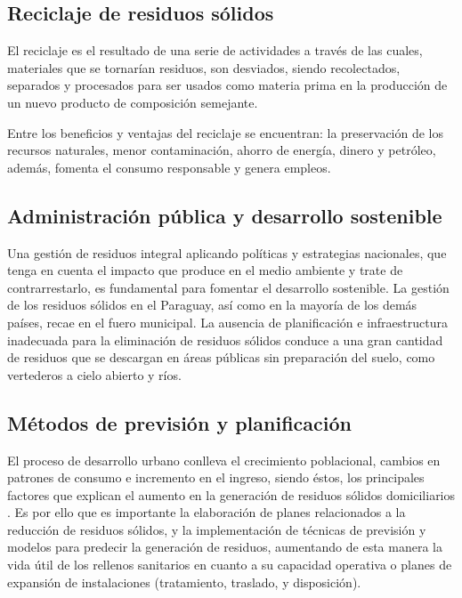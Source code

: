 \subsection{Reciclaje de residuos sólidos}

El reciclaje es el resultado de una serie de actividades a través de las cuales, materiales que se tornarían residuos, son desviados, siendo recolectados, separados y procesados para ser usados como materia prima en la producción de un nuevo producto de composición semejante.

Entre los beneficios y ventajas del reciclaje se encuentran: la preservación de los recursos naturales, menor contaminación, ahorro de energía, dinero y petróleo, además, fomenta el consumo responsable y genera empleos.

\subsection{Administración pública y desarrollo sostenible}

Una gestión de residuos integral aplicando políticas y estrategias nacionales, que tenga en cuenta el impacto que produce en el medio ambiente y trate de contrarrestarlo, es fundamental para fomentar el desarrollo sostenible. La gestión de los residuos sólidos en el Paraguay, así como en la mayoría de los demás países, recae en el fuero municipal. La ausencia de planificación e infraestructura inadecuada para la eliminación de residuos sólidos conduce a una gran cantidad de residuos que se descargan en áreas públicas sin preparación del suelo, como vertederos a cielo abierto y ríos.


\subsection{Métodos de previsión y planificación}

El proceso de desarrollo urbano conlleva el crecimiento poblacional, cambios en patrones de consumo e incremento en el ingreso, siendo éstos, los principales factores que explican el aumento en la generación de residuos sólidos domiciliarios \citep{Vasquez2005ModeloChile}. Es por ello que es importante la elaboración de planes relacionados a la reducción de residuos sólidos, y la implementación de técnicas de previsión y modelos para predecir la generación de residuos, aumentando de esta manera la vida útil de los rellenos sanitarios en cuanto a su capacidad operativa o planes de expansión de instalaciones (tratamiento, traslado, y disposición).

